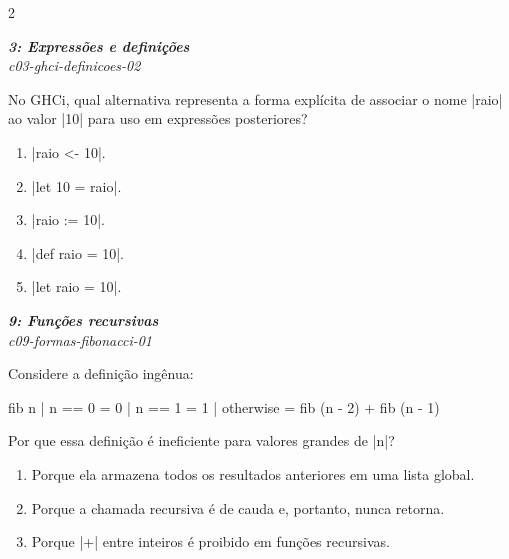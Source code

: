 \documentclass[a4paper,10pt,brazil]{article}
\begin{document}
\begin{multicols}{2}
\begin{enumerate}
\end{enumerate}

\begin{flushright}
  \footnotesize
  \textit{\textbf{3: Expressões e definições}}\\
  \textit{c03-ghci-definicoes-02}\\

\end{flushright}
No GHCi, qual alternativa representa a forma explícita de associar o nome \haskellinline|raio| ao valor \haskellinline|10| para uso em expressões posteriores?

\begin{enumerate}
  \item \haskellinline|raio <- 10|.

  \item \haskellinline|let 10 = raio|.

  \item \haskellinline|raio := 10|.

  \item \haskellinline|def raio = 10|.

  \item \haskellinline|let raio = 10|.


\end{enumerate}

\begin{flushright}
  \footnotesize
  \textit{\textbf{9: Funções recursivas}}\\
  \textit{c09-formas-fibonacci-01}\\

\end{flushright}
Considere a definição ingênua:
\begin{haskellcode}
fib n | n == 0    = 0
      | n == 1    = 1
      | otherwise = fib (n - 2) + fib (n - 1)
\end{haskellcode}
Por que essa definição é ineficiente para valores grandes de \haskellinline|n|?

\begin{enumerate}
  \item Porque ela armazena todos os resultados anteriores em uma lista global.

  \item Porque a chamada recursiva é de cauda e, portanto, nunca retorna.

  \item Porque \haskellinline|+| entre inteiros é proibido em funções recursivas.


\end{enumerate}
\end{multicols}
\end{document}
